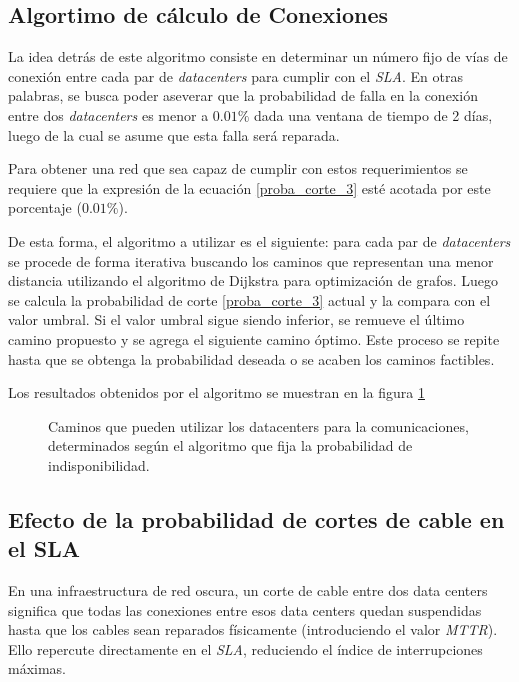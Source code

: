 \subsection{Algortimo de cálculo de Conexiones}
\label{sec:algoritmo_conex}

La idea detrás de este algoritmo consiste en determinar un número fijo 
de vías de conexión entre cada par de \emph{datacenters} para cumplir 
con el \emph{SLA}. En otras palabras, se busca poder aseverar que la 
probabilidad de falla en la conexión entre dos \emph{datacenters} es 
menor a $0.01 \%$ dada una ventana de tiempo de 2 días, luego de la cual
se asume que esta falla será reparada.

Para obtener una red que sea capaz de cumplir con estos requerimientos 
se requiere que la expresión de la ecuación \eqref{proba_corte_3} esté 
acotada por este porcentaje ($0.01\%$). 

De esta forma, el algoritmo a utilizar es el siguiente: para cada par 
de \emph{datacenters} se procede de forma iterativa buscando los caminos 
que representan una menor distancia utilizando el algoritmo de Dijkstra
para optimización de grafos. Luego se calcula la probabilidad de corte 
\eqref{proba_corte_3} actual y la compara con el valor umbral. Si el 
valor umbral sigue siendo inferior, se remueve el último camino propuesto 
y se agrega el siguiente camino óptimo. Este proceso se repite hasta que 
se obtenga la probabilidad deseada o se acaben los caminos factibles.

Los resultados obtenidos por el algoritmo se muestran en la figura
\ref{fig:caminos}

\begin{figure}[H]
  \centering
  \caption{Caminos que pueden utilizar los datacenters para la comunicaciones, determinados según el algoritmo que fija la probabilidad de indisponibilidad.}
  \label{fig:caminos}
\end{figure}


\subsection{Efecto de la probabilidad de cortes de cable en el SLA}
\label{sec:cortes}

En una infraestructura de red oscura, un corte de cable entre dos data
centers significa que todas las conexiones entre esos data centers
quedan suspendidas hasta que los cables sean reparados físicamente
(introduciendo el valor \emph{MTTR}). Ello repercute directamente
en el \emph{SLA}, reduciendo el índice de interrupciones máximas.

